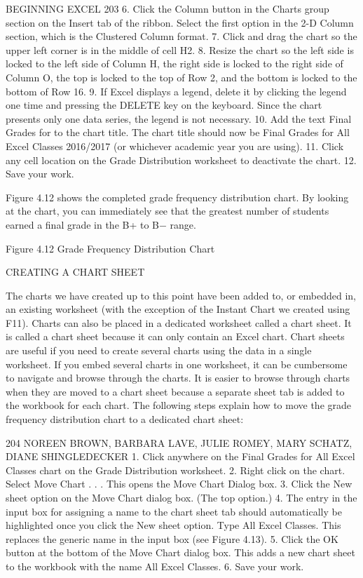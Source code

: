 BEGINNING EXCEL 203
6. Click the Column button in the Charts group section on the Insert tab of the ribbon. Select the
first option in the 2-D Column section, which is the Clustered Column format.
7. Click and drag the chart so the upper left corner is in the middle of cell H2.
8. Resize the chart so the left side is locked to the left side of Column H, the right side is locked to
the right side of Column O, the top is locked to the top of Row 2, and the bottom is locked to the
bottom of Row 16.
9. If Excel displays a legend, delete it by clicking the legend one time and pressing the DELETE key
on the keyboard. Since the chart presents only one data series, the legend is not necessary.
10. Add the text Final Grades for to the chart title. The chart title should now be Final Grades for
All Excel Classes 2016/2017 (or whichever academic year you are using).
11. Click any cell location on the Grade Distribution worksheet to deactivate the chart.
12. Save your work.

Figure 4.12 shows the completed grade frequency distribution chart. By looking at the chart, you can
immediately see that the greatest number of students earned a final grade in the B+ to B− range.




Figure 4.12 Grade Frequency Distribution Chart


CREATING A CHART SHEET

The charts we have created up to this point have been added to, or embedded in, an existing
worksheet (with the exception of the Instant Chart we created using F11). Charts can also be placed
in a dedicated worksheet called a chart sheet. It is called a chart sheet because it can only contain an
Excel chart. Chart sheets are useful if you need to create several charts using the data in a single
worksheet. If you embed several charts in one worksheet, it can be cumbersome to navigate and
browse through the charts. It is easier to browse through charts when they are moved to a chart
sheet because a separate sheet tab is added to the workbook for each chart. The following steps
explain how to move the grade frequency distribution chart to a dedicated chart sheet:



204 NOREEN BROWN, BARBARA LAVE, JULIE ROMEY, MARY SCHATZ, DIANE SHINGLEDECKER
1. Click anywhere on the Final Grades for All Excel Classes chart on the Grade Distribution
worksheet.
2. Right click on the chart. Select Move Chart . . . This opens the Move Chart Dialog box.
3. Click the New sheet option on the Move Chart dialog box. (The top option.)
4. The entry in the input box for assigning a name to the chart sheet tab should automatically be
highlighted once you click the New sheet option. Type All Excel Classes. This replaces the
generic name in the input box (see Figure 4.13).
5. Click the OK button at the bottom of the Move Chart dialog box. This adds a new chart sheet to
the workbook with the name All Excel Classes.
6. Save your work.




